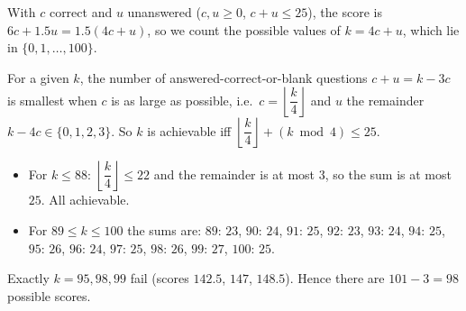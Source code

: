 With $c$ correct and $u$ unanswered ($c,u\ge0$, $c+u\le25$), the score is $6c+1.5u=1.5(4c+u)$, so we count the possible values of $k=4c+u$, which lie in $\{0,1,\dots,100\}$.

For a given $k$, the number of answered-correct-or-blank questions $c+u=k-3c$ is smallest when $c$ is as large as possible, i.e.\ $c=\left\lfloor\dfrac {k}{4}\right\rfloor$ and $u$ the remainder $k-4c\in\{0,1,2,3\}$. So $k$ is achievable iff $\left\lfloor\dfrac {k}{4}\right\rfloor+(k\bmod4)\le25$.
\begin{itemize}
\item For $k\le88$: $\left\lfloor\dfrac {k}{4}\right\rfloor\le22$ and the remainder is at most $3$, so the sum is at most $25$. All achievable.
\item For $89\le k\le100$ the sums are: $89{:}\,23$, $90{:}\,24$, $91{:}\,25$, $92{:}\,23$, $93{:}\,24$, $94{:}\,25$, $95{:}\,26$, $96{:}\,24$, $97{:}\,25$, $98{:}\,26$, $99{:}\,27$, $100{:}\,25$.
\end{itemize}
Exactly $k=95,98,99$ fail (scores $142.5$, $147$, $148.5$). Hence there are $101-3=\boxed{98}$ possible scores.
